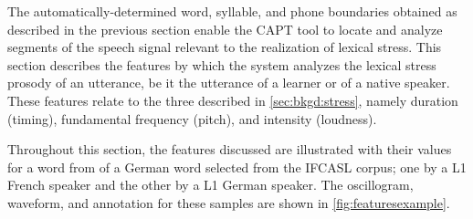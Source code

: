 	The automatically-determined word, syllable, and phone boundaries obtained as described in the previous section 
	enable the CAPT tool to locate and analyze segments of the speech signal relevant to the realization of lexical stress.
	This section describes the features by which the system analyzes the lexical stress prosody of an utterance, be it the utterance of a learner or of a native speaker. These features relate to the three  described in \cref{sec:bkgd:stress}, namely duration (timing), fundamental frequency (pitch), and intensity (loudness). 
%
%	



	Throughout this section, the features discussed are illustrated with their values for a word from  of a German word selected from the IFCASL corpus; one by a L1 French speaker and the other by a L1 German speaker. The oscillogram, waveform, and annotation for these samples are shown in \cref{fig:featuresexample}.
	
